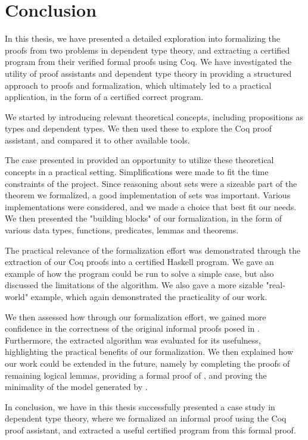 \chapter{Conclusion}

In this thesis, we have presented a detailed exploration into formalizing
the proofs from two problems in dependent type theory,
and extracting a certified program from their verified formal proofs using Coq.
We have investigated the utility of proof assistants and dependent type theory
in providing a structured approach to proofs and formalization,
which ultimately led to a practical application,
in the form of a certified correct program.

We started by introducing relevant theoretical concepts,
including propositions as types and dependent types.
We then used these to explore the Coq proof assistant,
and compared it to other available tools.

The case presented in 
provided an opportunity to utilize these theoretical concepts in a practical setting.
Simplifications were made to fit the time constraints of the project.
Since reasoning about sets were a sizeable part of the theorem we formalized,
a good implementation of sets was important.
Various implementations were considered, and we made a choice that best fit our needs.
We then presented the "building blocks" of our formalization,
in the form of various data types, functions, predicates, lemmas and theorems.

The practical relevance of the formalization effort was demonstrated through the extraction
of our Coq proofs into a certified Haskell program.
We gave an example of how the program could be run to solve a simple case,
but also discussed the limitations of the algorithm.
We also gave a more sizable "real-world" example, which again
demonstrated the practicality of our work.

We then assessed how through our formalization effort,
we gained more confidence in the correctness of the original informal proofs posed in \cite{mbezem}.
Furthermore, the extracted algorithm was evaluated for its usefulness,
highlighting the practical benefits of our formalization.
We then explained how our work could be extended in the future,
namely by completing the proofs of remaining logical lemmas,
providing a formal proof of , and proving the minimality of the model generated by .

In conclusion, we have in this thesis successfully presented
a case study in dependent type theory, where we formalized an informal proof using
the Coq proof assistant, and extracted a useful certified program from this formal proof.

